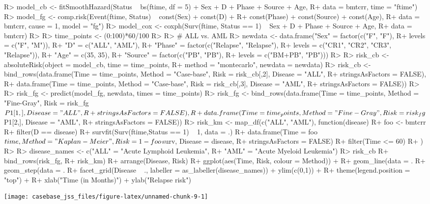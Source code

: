 \documentclass[article]{jss}
\begin{document}
\begin{CodeChunk}
\begin{CodeInput}
R> model_cb <- fitSmoothHazard(Status ~ bs(ftime, df = 5) + Sex + D + Phase + Source + Age,
R+                             data = bmtcrr, time = "ftime")
R> model_fg <- comp.risk(Event(ftime, Status) ~ const(Sex) + const(D) + 
R+                           const(Phase) + const(Source) + const(Age), 
R+                       data = bmtcrr, cause = 1, model = "fg")
R> model_cox <- coxph(Surv(ftime, Status == 1) ~ Sex + D + Phase + Source + Age,
R+                    data = bmtcrr)
R> 
R> time_points <- (0:100)*60/100
R> 
R> # ALL vs. AML
R> newdata <- data.frame("Sex" = factor(c("F", "F"), 
R+                                      levels = c("F", "M")),
R+                       "D" = c("ALL", "AML"),
R+                       "Phase" = factor(c("Relapse", "Relapse"), 
R+                                        levels = c("CR1", "CR2", "CR3", "Relapse")),
R+                       "Age" = c(35, 35),
R+                       "Source" = factor(c("PB", "PB"), 
R+                                         levels = c("BM+PB", "PB")))
R> 
R> risk_cb <- absoluteRisk(object = model_cb, time = time_points,
R+                         method = "montecarlo", newdata = newdata)
R> risk_cb <- bind_rows(data.frame(Time = time_points, Method = "Case-base", Risk = risk_cb[,2], Disease = "ALL",
R+                                 stringsAsFactors = FALSE),
R+                      data.frame(Time = time_points, Method = "Case-base", Risk = risk_cb[,3], Disease = "AML",
R+                                 stringsAsFactors = FALSE))
R> 
R> risk_fg <- predict(model_fg, newdata, times = time_points)
R> risk_fg <- bind_rows(data.frame(Time = time_points, Method = "Fine-Gray", Risk = risk_fg$P1[1,], Disease = "ALL",
R+                                 stringsAsFactors = FALSE),
R+                      data.frame(Time = time_points, Method = "Fine-Gray", Risk = risk_fg$P1[2,], Disease = "AML",
R+                                 stringsAsFactors = FALSE))
R> risk_km <- map_df(c("ALL", "AML"), function(disease) {
R+     foo <- bmtcrr %
R+         filter(D == disease) %
R+         survfit(Surv(ftime,Status == 1) ~ 1, data = .)
R+     data.frame(Time = foo$time, Method = "Kaplan-Meier", Risk = 1 - foo$surv, Disease = disease,
R+                stringsAsFactors = FALSE) %
R+         filter(Time <= 60)
R+ })
R> 
R> disease_names <- c("ALL" = "Acute Lymphoid Leukemia",
R+                    "AML" = "Acute Myeloid Leukemia")
R> risk_cb %
R+     bind_rows(risk_fg,
R+               risk_km) %
R+     arrange(Disease, Risk) %
R+     ggplot(aes(Time, Risk, colour = Method)) + 
R+     geom_line(data = . %
R+     geom_step(data = . %
R+     facet_grid(Disease ~ ., labeller = as_labeller(disease_names)) + ylim(c(0,1)) +
R+     theme(legend.position = "top") +
R+     xlab("Time (in Months)") + ylab("Relapse risk")
\end{CodeInput}


\begin{center}\texttt{[image: casebase\_jss\_files/figure-latex/unnamed-chunk-9-1]} \end{center}

\end{CodeChunk}
\end{document}
